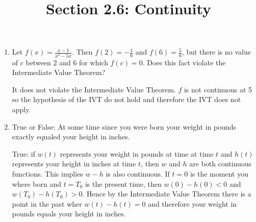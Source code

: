 \documentclass[nooutcomes, handout]{ximera}
\title{Section 2.6: Continuity}
\begin{document}
\begin{abstract}		\end{abstract}
\maketitle

\begin{problem}
	\begin{enumerate}
   	\item  Let $f(x) = \frac{x-1}{x^2 - 5x}$.  Then $f(2)=-\frac{1}{6}$ and $f(6)=\frac{5}{6}$, but there is no value of $c$ between $2$ and $6$ for which $f(c)=0$.  Does this fact violate the Intermediate Value Theorem?

      \begin{freeResponse}
        It does not violate the Intermediate Value Theorem.  $f$ is not continuous at 5 so the hypothesis of the IVT do not hold and therefore the IVT does not apply.
      \end{freeResponse}

	\item	True or False: At some time since you were born your weight in pounds exactly equaled your height in inches.
      \begin{freeResponse}
        True: if $w(t)$ represents your weight in pounds at time at time $t$ and $h(t)$ represents your height in inches at time $t$, then $w$ and $h$ are both continuous functions.  This implies $w - h$ is also continuous.
        If $t = 0$ is the moment you where born and $t = T_0$ is the present time, then $w(0) - h(0) < 0$ and $w(T_0) - h(T_0) > 0$.
        Hence by the Intermediate Value Theorem there is a point in the past wher $w(t)-h(t)=0$ and therefore your weight in pounds equals your height in inches.
      \end{freeResponse}
	
	\end{enumerate}

\end{problem}
\end{document}
